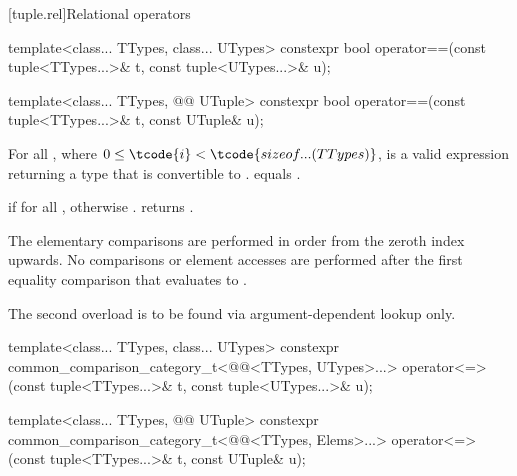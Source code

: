 \documentclass{wg21}
\begin{document}
[tuple.rel]{Relational operators}

%
\begin{itemdecl}
template<class... TTypes, class... UTypes>
constexpr bool operator==(const tuple<TTypes...>& t, const tuple<UTypes...>& u);
\end{itemdecl}
\begin{addedblock}
\begin{itemdecl}
template<class... TTypes, @@ UTuple>
constexpr bool operator==(const tuple<TTypes...>& t, const UTuple& u);
\end{itemdecl}
\end{addedblock}

\begin{itemdescr}

    \pnum
    \mandates
    For all ,
    where $0 \leq \tcode{i} < \tcode{sizeof...(TTypes)}$,
     is a valid expression
    returning a type that is convertible to .
     equals
    .

    \pnum
    \returns
     if  for all
    , otherwise .
    \added{[Note:}
     returns .
    \added{]}

    \pnum
    \remarks
    The elementary comparisons are performed in order from the
    zeroth index upwards.  No comparisons or element accesses are
    performed after the first equality comparison that evaluates to
    .

    \begin{addedblock}
    \remarks The second overload is to be found via argument-dependent lookup only.
    \end{addedblock}

\end{itemdescr}

%
\begin{itemdecl}
template<class... TTypes, class... UTypes>
constexpr common_comparison_category_t<@@<TTypes, UTypes>...>
operator<=>(const tuple<TTypes...>& t, const tuple<UTypes...>& u);
\end{itemdecl}
\begin{addedblock}
\begin{itemdecl}
template<class... TTypes, @@ UTuple>
constexpr common_comparison_category_t<@@<TTypes, Elems>...>
operator<=>(const tuple<TTypes...>& t, const UTuple& u);
\end{itemdecl}
\end{addedblock}
\end{document}
